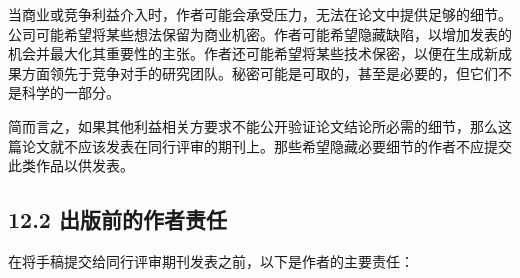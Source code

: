 当商业或竞争利益介入时，作者可能会承受压力，无法在论文中提供足够的细节。公司可能希望将某些想法保留为商业机密。作者可能希望隐藏缺陷，以增加发表的机会并最大化其重要性的主张。作者还可能希望将某些技术保密，以便在生成新成果方面领先于竞争对手的研究团队。秘密可能是可取的，甚至是必要的，但它们不是科学的一部分。

简而言之，如果其他利益相关方要求不能公开验证论文结论所必需的细节，那么这篇论文就不应该发表在同行评审的期刊上。那些希望隐藏必要细节的作者不应提交此类作品以供发表。

\subsection*{12.2 出版前的作者责任}
在将手稿提交给同行评审期刊发表之前，以下是作者的主要责任：

